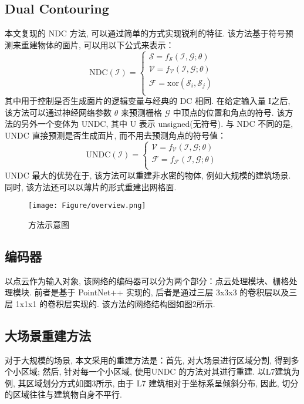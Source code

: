 \subsection{Dual Contouring}
本文复现的 NDC 方法, 可以通过简单的方式实现锐利的特征. 该方法基于符号预测来重建物体的面片, 可以用以下公式来表示：
\begin{equation}
\mathrm{NDC}(\mathcal{I}) =
\begin{cases}
\mathcal{S} = f_{\mathcal{S}}(\mathcal{I,G};\theta) \\
\mathcal{V} = f_{\mathcal{V}}(\mathcal{I,G};\theta) \\
\mathcal{F} = \mathrm{xor}(\mathcal{S}_i, \mathcal{S}_j) \\
\end{cases}
\end{equation}
其中用于控制是否生成面片的逻辑变量与经典的 DC 相同. 在给定输入量 I之后, 该方法可以通过神经网络参数 $\theta$ 来预测栅格 $\mathcal{G}$ 中顶点的位置和角点的符号. 
该方法的另外一个变体为 UNDC, 其中 U 表示 unsigned(无符号). 与 NDC 不同的是, UNDC 直接预测是否生成面片, 而不用去预测角点的符号值：
\begin{equation}
\mathrm{UNDC}(\mathcal{I}) =
\begin{cases}
\mathcal{V} = f_{\mathcal{V}}(\mathcal{I,G};\theta) \\
\mathcal{F} = f_{\mathcal{F}}(\mathcal{I,G};\theta) \\
\end{cases}
\end{equation}
UNDC 最大的优势在于, 该方法可以重建非水密的物体, 例如大规模的建筑场景. 同时, 该方法还可以以薄片的形式重建出网格面. 

\begin{figure}[H]
	\center
	\texttt{[image: Figure/overview.png]}
	\centering
	\caption{方法示意图}\label{fig:fig1}
\end{figure}

\subsection{编码器}
以点云作为输入对象, 该网络的编码器可以分为两个部分：点云处理模块、栅格处理模块. 前者是基于 PointNet++ 实现的, 后者是通过三层 3x3x3 的卷积层以及三层 1x1x1 的卷积层实现的. 该方法的网络结构图如图2所示. 

\subsection{大场景重建方法}
对于大规模的场景, 本文采用的重建方法是：首先, 对大场景进行区域分割, 得到多个小区域; 然后, 针对每一个小区域, 使用UNDC 的方法对其进行重建. 以L7建筑为例, 其区域划分方式如图3所示, 由于 L7 建筑相对于坐标系呈倾斜分布, 因此, 切分的区域往往与建筑物自身不平行. 


